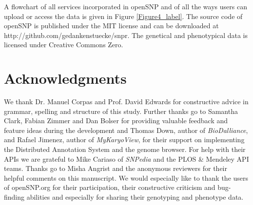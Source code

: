 \documentclass[10pt]{article}
\begin{document}
A flowchart of all services incorporated in openSNP and of all the ways users can upload or access the data is given in Figure \ref{Figure4_label}. The source code of openSNP is 
published under the MIT license and can be downloaded at http://github.com/gedankenstuecke/snpr. The genetical and phenotypical data is licensed under Creative Commons Zero. 
\section*{Acknowledgments}
We thank Dr. Manuel Corpas and Prof. David Edwards for constructive advice in grammar, spelling and structure of this study. Further thanks go to Samantha Clark, Fabian Zimmer and Dan Bolser for providing valuable feedback and feature ideas during the development and Thomas Down, author of \emph{BioDalliance}, and Rafael Jimenez, author of \emph{MyKaryoView}, for their support on implementing the Distributed Annotation System and the genome browser. For help with their APIs we are grateful to Mike Cariaso of \emph{SNPedia} and the PLOS \& Mendeley API teams. Thanks go to Misha Angrist and the anonymous reviewers for their helpful comments on this manuscript. We would especially like to thank the users of openSNP.org for their participation, their constructive criticism and bug-finding abilities and especially for sharing their genotyping and phenotype data.


\end{document}
